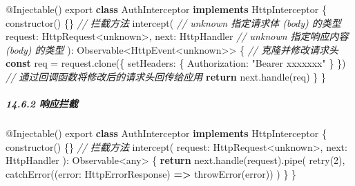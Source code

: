 \documentclass[
]{article}
\newenvironment{Shaded}{}{}
\newcommand{\CommentTok}[1]{\textcolor[rgb]{0.38,0.63,0.69}{\textit{#1}}}
\newcommand{\ControlFlowTok}[1]{\textcolor[rgb]{0.00,0.44,0.13}{\textbf{#1}}}
\newcommand{\DataTypeTok}[1]{\textcolor[rgb]{0.56,0.13,0.00}{#1}}
\newcommand{\DecValTok}[1]{\textcolor[rgb]{0.25,0.63,0.44}{#1}}
\newcommand{\FunctionTok}[1]{\textcolor[rgb]{0.02,0.16,0.49}{#1}}
\newcommand{\ImportTok}[1]{#1}
\newcommand{\KeywordTok}[1]{\textcolor[rgb]{0.00,0.44,0.13}{\textbf{#1}}}
\newcommand{\NormalTok}[1]{#1}
\newcommand{\OperatorTok}[1]{\textcolor[rgb]{0.40,0.40,0.40}{#1}}
\newcommand{\StringTok}[1]{\textcolor[rgb]{0.25,0.44,0.63}{#1}}
\begin{document}
\begin{Shaded}
\begin{Highlighting}[]
\NormalTok{@}\FunctionTok{Injectable}\NormalTok{()}
\ImportTok{export} \KeywordTok{class}\NormalTok{ AuthInterceptor }\KeywordTok{implements}\NormalTok{ HttpInterceptor \{}
  \FunctionTok{constructor}\NormalTok{() \{\}}
	\CommentTok{// 拦截方法}
  \FunctionTok{intercept}\NormalTok{(}
  	\CommentTok{// unknown 指定请求体 (body) 的类型}
    \DataTypeTok{request}\OperatorTok{:}\NormalTok{ HttpRequest}\OperatorTok{\textless{}}\NormalTok{unknown}\OperatorTok{\textgreater{},}
    \DataTypeTok{next}\OperatorTok{:}\NormalTok{ HttpHandler}
     \CommentTok{// unknown 指定响应内容 (body) 的类型}
\NormalTok{  )}\OperatorTok{:}\NormalTok{ Observable}\OperatorTok{\textless{}}\NormalTok{HttpEvent}\OperatorTok{\textless{}}\NormalTok{unknown}\OperatorTok{\textgreater{}\textgreater{}}\NormalTok{ \{}
    \CommentTok{// 克隆并修改请求头}
    \KeywordTok{const}\NormalTok{ req }\OperatorTok{=}\NormalTok{ request}\OperatorTok{.}\FunctionTok{clone}\NormalTok{(\{}
      \DataTypeTok{setHeaders}\OperatorTok{:}\NormalTok{ \{}
        \DataTypeTok{Authorization}\OperatorTok{:} \StringTok{"Bearer xxxxxxx"}
\NormalTok{      \}}
\NormalTok{    \})}
    \CommentTok{// 通过回调函数将修改后的请求头回传给应用}
    \ControlFlowTok{return}\NormalTok{ next}\OperatorTok{.}\FunctionTok{handle}\NormalTok{(req)}
\NormalTok{  \}}
\NormalTok{\}}
\end{Highlighting}
\end{Shaded}

\hypertarget{1462-ux54cdux5e94ux62e6ux622a}{%
\subparagraph{14.6.2 响应拦截}\label{1462-ux54cdux5e94ux62e6ux622a}}

\begin{Shaded}
\begin{Highlighting}[]
\NormalTok{@}\FunctionTok{Injectable}\NormalTok{()}
\ImportTok{export} \KeywordTok{class}\NormalTok{ AuthInterceptor }\KeywordTok{implements}\NormalTok{ HttpInterceptor \{}
  \FunctionTok{constructor}\NormalTok{() \{\}}
	\CommentTok{// 拦截方法}
  \FunctionTok{intercept}\NormalTok{(}
    \DataTypeTok{request}\OperatorTok{:}\NormalTok{ HttpRequest}\OperatorTok{\textless{}}\NormalTok{unknown}\OperatorTok{\textgreater{},}
    \DataTypeTok{next}\OperatorTok{:}\NormalTok{ HttpHandler}
\NormalTok{  )}\OperatorTok{:}\NormalTok{ Observable}\OperatorTok{\textless{}}\NormalTok{any}\OperatorTok{\textgreater{}}\NormalTok{ \{}
    \ControlFlowTok{return}\NormalTok{ next}\OperatorTok{.}\FunctionTok{handle}\NormalTok{(request)}\OperatorTok{.}\FunctionTok{pipe}\NormalTok{(}
      \FunctionTok{retry}\NormalTok{(}\DecValTok{2}\NormalTok{)}\OperatorTok{,}
      \FunctionTok{catchError}\NormalTok{((}\DataTypeTok{error}\OperatorTok{:}\NormalTok{ HttpErrorResponse) }\KeywordTok{=\textgreater{}} \FunctionTok{throwError}\NormalTok{(error))}
\NormalTok{    )}
\NormalTok{  \}}
\NormalTok{\}}
\end{Highlighting}
\end{Shaded}
\end{document}
